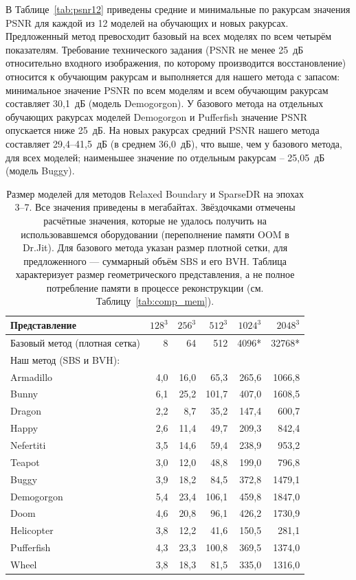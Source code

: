В Таблице~\ref{tab:psnr12} приведены средние и минимальные по ракурсам значения PSNR для каждой из 12 моделей на обучающих и новых ракурсах. Предложенный метод превосходит базовый на всех моделях по всем четырём показателям. Требование технического задания (PSNR не менее 25~дБ относительно входного изображения, по которому производится восстановление) относится к обучающим ракурсам и выполняется для нашего метода с запасом: минимальное значение PSNR по всем моделям и всем обучающим ракурсам составляет 30,1~дБ (модель Demogorgon). У базового метода на отдельных обучающих ракурсах моделей Demogorgon и Pufferfish значение PSNR опускается ниже 25~дБ. На новых ракурсах средний PSNR нашего метода составляет 29,4--41,5~дБ (в среднем 36,0~дБ), что выше, чем у базового метода, для всех моделей; наименьшее значение по отдельным ракурсам -- 25,05~дБ (модель Buggy).


\begin{table}
    \centering
    \caption{Размер моделей для методов Relaxed Boundary и SparseDR на эпохах 3--7. Все значения приведены в мегабайтах. Звёздочками отмечены расчётные значения, которые не удалось получить на использовавшемся оборудовании (переполнение памяти OOM в Dr.Jit). Для базового метода указан размер плотной сетки, для предложенного --- суммарный объём SBS и его BVH. Таблица характеризует размер геометрического представления, а не полное потребление памяти в процессе реконструкции (см. Таблицу~\ref{tab:comp_mem}).}
    \label{tab:comp_size}
    \begin{tabular}{lrrrrr}
        \toprule
        Представление & $128^3$ & $256^3$ & $512^3$ & $1024^3$ & $2048^3$ \\
        \midrule
        Базовый метод (плотная сетка) & 8 & 64 & 512 & 4096* & 32768* \\
        \midrule
        \multicolumn{6}{l}{Наш метод (SBS и BVH):} \\
        \quad Armadillo & 4,0 & 16,0 & 65,3 & 265,6 & 1066,8 \\
        \quad Bunny & 6,1 & 25,2 & 101,7 & 407,0 & 1608,5 \\
        \quad Dragon & 2,2 & 8,7 & 35,2 & 147,4 & 600,7 \\
        \quad Happy & 2,6 & 11,4 & 49,7 & 209,3 & 842,4 \\
        \quad Nefertiti & 3,5 & 14,6 & 59,4 & 238,9 & 953,2 \\
        \quad Teapot & 3,0 & 12,0 & 48,8 & 199,0 & 796,8 \\
        \quad Buggy & 3,9 & 18,2 & 84,5 & 372,8 & 1479,1 \\
        \quad Demogorgon & 5,4 & 23,4 & 106,1 & 459,8 & 1847,0 \\
        \quad Doom & 4,6 & 20,8 & 96,1 & 426,2 & 1730,9 \\
        \quad Helicopter & 3,8 & 12,2 & 41,6 & 150,5 & 281,1 \\
        \quad Pufferfish & 4,3 & 23,3 & 100,8 & 369,5 & 1374,0 \\
        \quad Wheel & 3,8 & 18,3 & 81,5 & 335,0 & 1316,0 \\
        \bottomrule
    \end{tabular}
\end{table}

